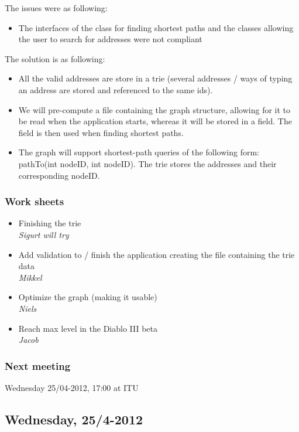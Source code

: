 \documentclass[a4paper,11pt]{article}
\begin{document}
The issues were as following:
\begin{itemize}
	\item The interfaces of the class for finding shortest paths and the classes allowing the user to search for addresses were not compliant
\end{itemize}

The solution is as following:
\begin{itemize}
	\item All the valid addresses are store in a trie (several addresses / ways of typing an address are stored and referenced to the same ids).
	\item We will pre-compute a file containing the graph structure, allowing for it to be read when the application starts, whereas it will be stored in a field. The field is then used when finding shortest paths.
	\item The graph will support shortest-path queries of the following form: pathTo(int nodeID, int nodeID). The trie stores the addresses and their corresponding nodeID.
\end{itemize}

\subsubsection*{Work sheets}
\begin{itemize}
	\item Finishing the trie \\
		\textsl{Sigurt will \textsl{try}}
	\item Add validation to / finish the application creating the file containing the trie data \\
		\textsl{Mikkel}
	\item Optimize the graph (making it usable) \\
		\textsl{Niels}
	\item Reach max level in the Diablo III beta \\
		\textsl{Jacob}
\end{itemize}

\subsubsection*{Next meeting}
Wednesday 25/04-2012, 17:00 at ITU


\pagebreak
\subsection{Wednesday, 25/4-2012}
\end{document}

